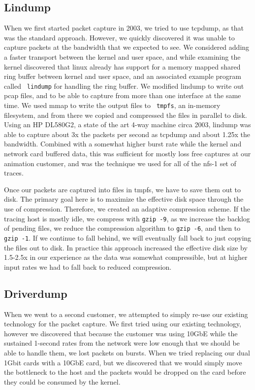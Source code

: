 \subsection{Lindump}

When we first started packet capture in 2003, we tried to use tcpdump,
as that was the standard approach.  However, we quickly discovered it
was unable to capture packets at the bandwidth that we expected to
see.  We considered adding a faster transport between the kernel and
user space, and while examining the kernel discovered that linux
already has support for a memory mapped shared ring buffer between
kernel and user space, and an associated example program called {\tt
lindump} for handling the ring buffer.  We modified lindump to write
out pcap files, and to be able to capture from more than one interface
at the same time.  We used mmap to write the output files to {\tt
tmpfs}, an in-memory filesystem, and from there we copied and
compressed the files in parallel to disk.  Using an HP DL580G2, a
state of the art 4-way machine circa 2003, lindump was able to capture
about 3x the packets per second as tcpdump and about 1.25x the
bandwidth.  Combined with a somewhat higher burst rate while the
kernel and network card buffered data, this was sufficient for mostly
loss free captures at our animation customer, and was the technique we
used for all of the nfs-1 set of traces.

Once our packets are captured into files in tmpfs, we have to save
them out to disk.  The primary goal here is to maximize the effective
disk space through the use of compression.  Therefore, we created an
adaptive compression scheme.  If the tracing host is mostly idle, we
compress with {\tt gzip -9}, as we increase the backlog of pending
files, we reduce the compression algorithm to {\tt gzip -6}, and then
to {\tt gzip -1}.  If we continue to fall behind, we will eventually
fall back to just copying the files out to disk.  In practice this
approach increased the effective disk size by 1.5-2.5x in our
experience as the data was somewhat compressible, but at higher input
rates we had to fall back to reduced compression.

\subsection{Driverdump}

When we went to a second customer, we attempted to simply re-use our
existing technology for the packet capture.  We first tried using our
existing technology, however we discovered that because the customer
was using 10GbE while the sustained 1-second rates from the network
were low enough that we should be able to handle them, we lost packets
on bursts.  When we tried replacing our dual 1Gbit cards with a 10GbE
card, but we discovered that we would simply move the bottleneck to
the host and the packets would be dropped on the card before they
could be consumed by the kernel.

